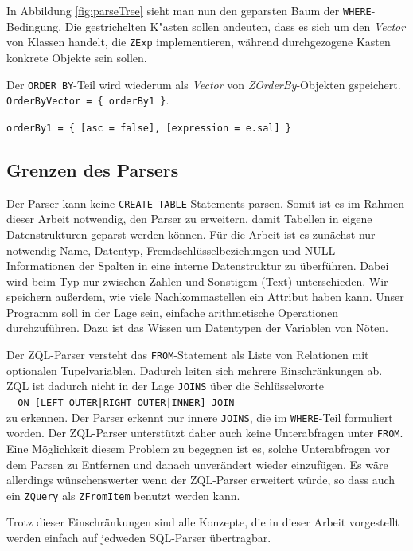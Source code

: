 In Abbildung \ref{fig:parseTree} sieht man nun den geparsten Baum der \verb|WHERE|-Bedingung. Die gestrichelten K"asten sollen andeuten, dass es sich um den \textit{Vector} von Klassen handelt, die \verb|ZExp| implementieren, während durchgezogene Kasten konkrete Objekte sein sollen.

Der \verb|ORDER BY|-Teil wird wiederum als \textit{Vector} von \textit{ZOrderBy}-Objekten gspeichert.\\
\verb|OrderByVector = { orderBy1 }|.

\verb|orderBy1 = { [asc = false], [expression = e.sal] }|

\subsection{Grenzen des Parsers}
\label{subsec:grenzenparser}

Der Parser kann keine \verb|CREATE TABLE|-Statements parsen. Somit ist es im Rahmen dieser Arbeit notwendig, den Parser zu erweitern, damit Tabellen in eigene Datenstrukturen geparst werden können. Für die Arbeit ist es zunächst nur notwendig Name, Datentyp, Fremdschlüsselbeziehungen und NULL-Informationen der Spalten in eine interne Datenstruktur zu überführen. Dabei wird beim Typ nur zwischen Zahlen und Sonstigem (Text) unterschieden. Wir speichern außerdem, wie viele Nachkommastellen ein Attribut haben kann. Unser Programm soll in der Lage sein, einfache arithmetische Operationen durchzuführen. Dazu ist das Wissen um Datentypen der Variablen von Nöten.

Der ZQL-Parser versteht das \verb|FROM|-Statement als Liste von Relationen mit optionalen Tupelvariablen. Dadurch leiten sich mehrere Einschränkungen ab. ZQL ist dadurch nicht in der Lage \verb|JOINS| über die Schlüsselworte \\\verb#  ON [LEFT OUTER|RIGHT OUTER|INNER] JOIN# \\zu erkennen. Der Parser erkennt nur innere \verb|JOINS|, die im \verb|WHERE|-Teil formuliert worden. Der ZQL-Parser unterstützt daher auch keine Unterabfragen unter \verb|FROM|. Eine Möglichkeit diesem Problem zu begegnen ist es, solche Unterabfragen vor dem Parsen zu Entfernen und danach unverändert wieder einzufügen. Es wäre allerdings wünschenswerter wenn der ZQL-Parser erweitert würde, so dass auch ein \verb|ZQuery| als \verb|ZFromItem| benutzt werden kann.

Trotz dieser Einschränkungen sind alle Konzepte, die in dieser Arbeit vorgestellt werden einfach auf jedweden SQL-Parser übertragbar.


